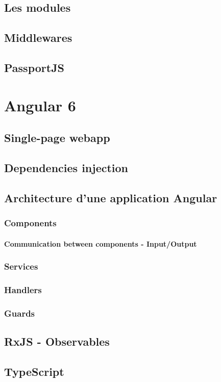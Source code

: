 \documentclass[11pt,a4paper]{report}
\begin{document}
\section{Les modules}
\section{Middlewares}
\section{PassportJS}
\chapter{Angular 6}
\section{Single-page webapp}
\section{Dependencies injection}
\section{Architecture d'une application Angular}
\subsection{Components}
\subsubsection{Communication between components - Input/Output}
\subsection{Services}
\subsection{Handlers}
\subsection{Guards}
\section{RxJS - Observables}
\section{TypeScript}
\end{document}
